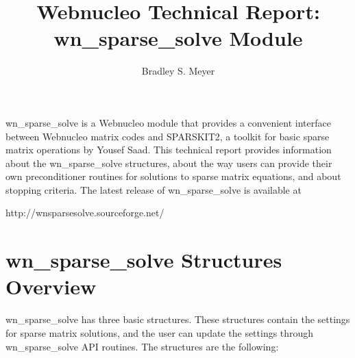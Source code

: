 \documentclass{article}    %
\title{Webnucleo Technical Report: wn\_sparse\_solve Module}
\author{Bradley S. Meyer}
\begin{document}

\maketitle                 %

wn\_sparse\_solve is a Webnucleo module that provides a convenient interface
between Webnucleo matrix codes and SPARSKIT2, a toolkit for basic sparse
matrix operations by Yousef Saad.  This technical report provides information
about the wn\_sparse\_solve structures, about the way users can provide
their own preconditioner routines for solutions to sparse matrix equations,
and about stopping criteria.
The latest release of wn\_sparse\_solve is available at
\begin{center}
http://wnsparsesolve.sourceforge.net/
\end{center}

\section{wn\_sparse\_solve Structures Overview}  

wn\_sparse\_solve has three basic structures.  These structures contain the
settings for sparse matrix solutions, and the user can update the settings
through wn\_sparse\_solve API routines.  The structures are the following:
\end{document}
